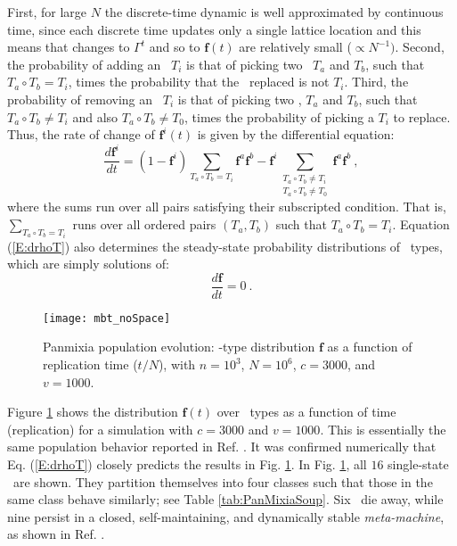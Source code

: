 \documentclass[pre,twocolumn,showpacs,superscriptaddress,preprintnumbers,floatfix]{revtex4}
\theoremstyle{plain}    \newtheorem{Lem}{Lemma}
\theoremstyle{plain}    \newtheorem*{ProLem}{Proof}
\theoremstyle{plain}    \newtheorem{Cor}{Corollary}
\theoremstyle{plain}    \newtheorem*{ProCor}{Proof}
\theoremstyle{plain}    \newtheorem{The}{Theorem}
\theoremstyle{plain}    \newtheorem*{ProThe}{Proof}
\theoremstyle{plain}    \newtheorem{Prop}{Proposition}
\theoremstyle{plain}    \newtheorem*{ProProp}{Proof}
\theoremstyle{plain}    \newtheorem*{Conj}{Conjecture}
\theoremstyle{plain}    \newtheorem*{Rem}{Remark}
\theoremstyle{plain}    \newtheorem{Def}{Definition}
\theoremstyle{plain}    \newtheorem*{Not}{Notation}
\newcommand{\PrEMType}{\mathbf{f}}
\begin{document}
First, for large $N$ the discrete-time dynamic is well
approximated by continuous time, since each discrete time updates
only a single lattice location and this means that changes to
$\Gamma^t$ and so to $\PrEMType(t)$ are relatively small ($\propto N^{-1})$.
Second, the probability of adding an \eM\ $T_i$ is that of picking
two \eMs\ $T_a$ and $T_b$, such that $T_a \circ T_b = T_i$, times the
probability that the \eM\ replaced is not $T_i$. Third, the probability of
removing an \eM\ $T_i$ is that of picking two \eMs, $T_a$ and $T_b$, such that
$T_a \circ T_b \neq T_i$ and also $T_a \circ T_b \neq T_0$, times the
probability of picking a $T_i$ to replace. Thus, the rate of change of
$\PrEMType^i (t)$ is given by the differential equation:
\begin{equation}
\dfrac{d\PrEMType^i}{dt}
  = \left( 1 - \PrEMType^i \right)
  \sum_{T_a \circ T_b = T_i} \PrEMType^a \PrEMType^b
  - \PrEMType^i
  \sum_{\substack{T_a \circ T_b \neq T_i \\ T_a \circ T_b \neq T_0}}
  \PrEMType^a \PrEMType^b ~,
\label{E:drhoT}
\end{equation}
where the sums run over all pairs satisfying their subscripted condition. That
is, $\sum_{T_a \circ T_b = T_i}$ runs over all ordered pairs $(T_a, T_b)$ such
that $T_a \circ T_b = T_i$. Equation (\ref{E:drhoT}) also determines the
steady-state probability distributions of \eM\ types, which are simply
solutions of:
\begin{equation}
\dfrac{d\PrEMType}{dt} = 0 ~.
\end{equation}

\begin{figure}[h]
\centering
\texttt{[image: mbt\_noSpace]}
\caption{Panmixia population evolution: \EM-type distribution $\PrEMType$
  as a function of replication time ($t/N$), with $n = 10^3$, $N = 10^6$, $c =
  3000$, and $v = 1000$.
  }
\label{WM_PD}
\end{figure}

Figure \ref{WM_PD} shows the distribution $\PrEMType (t)$ over \eM\ types as a
function of time (replication) for a simulation with $c=3000$ and $v=1000$. This
is essentially the same population behavior reported in Ref. \cite{OTMOMerge}.
It was confirmed numerically that Eq. (\ref{E:drhoT}) closely predicts the
results in Fig. \ref{WM_PD}. In Fig. \ref{WM_PD}, all $16$ single-state
\eMs\ are shown. They partition themselves into four classes such that
those in the same class behave similarly; see Table \ref{tab:PanMixiaSoup}.
Six \eMs\ die away, while nine persist in a closed, self-maintaining, and
dynamically stable \emph{meta-machine}, as shown in Ref. \cite{OTMOMerge}.
\end{document}

